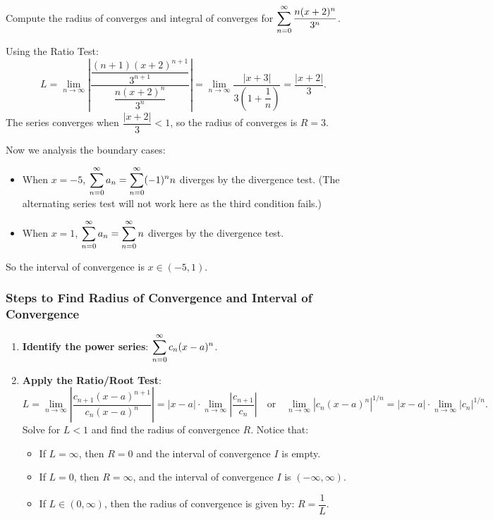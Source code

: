 \begin{ex}
    Compute the radius of converges and integral of converges for $\displaystyle\sum_{n=0}^\infty \dfrac{n(x+2)^n}{3^n}$.

    Using the Ratio Test:
    \[ L = \lim_{n\to \infty} \left| \dfrac{\dfrac{(n+1)(x+2)^{n+1}}{3^{n+1}}}{\dfrac{n(x+2)^n}{3^n}}\right| = \lim_{n\to \infty} \dfrac{|x+3|}{3\left(1+\dfrac{1}{n}\right)} = \dfrac{|x+2|}{3}.\]
    The series converges when $\dfrac{|x+2|}{3}< 1$, so the radius of converges is $R=3$.
    
    Now we analysis the boundary cases:
    
    \begin{itemize}
        \item When $x=-5$, $\displaystyle\sum_{n=0}^\infty  a_n = \displaystyle\sum_{n=0}^\infty (-1)^n n$ diverges by the divergence test. (The alternating series test will not work here as the third condition fails.)

        \item When $x=1$, $\displaystyle\sum_{n=0}^\infty  a_n = \displaystyle\sum_{n=0}^\infty n$ diverges by the divergence test. 
    \end{itemize}

    So the interval of convergence is $x \in (-5,1)$.
\end{ex}

\subsubsection{Steps to Find Radius of Convergence and Interval of Convergence}
\begin{enumerate}
    \item \textbf{Identify the power series}: $\displaystyle\sum_{n=0}^\infty c_n (x - a)^n$.

    \item \textbf{Apply the Ratio/Root Test}:
    \[
    L = \lim_{n \to \infty} \left| \dfrac{c_{n+1}(x-a)^{n+1}}{c_n(x-a)^n} \right| = |x-a| \cdot \lim_{n \to \infty} \left| \dfrac{c_{n+1}}{c_n} \right| \quad \text{or}\quad \lim_{n \to \infty} |c_n(x-a)^n|^{1/n} = |x-a| \cdot \lim_{n \to \infty} |c_n|^{1/n}.
    \]
    Solve for $L < 1$ and find the radius of convergence $R$.
Notice that:
\begin{itemize}
    \item If $L = \infty$, then $R = 0$ and the interval of convergence $I$ is empty.
    \item If $L = 0$, then $R = \infty$, and the interval of convergence $I$ is $(-\infty, \infty)$.
    \item If $L \in (0, \infty)$, then the radius of convergence is given by: $R = \dfrac{1}{L}$.
\end{itemize}
\end{enumerate}

